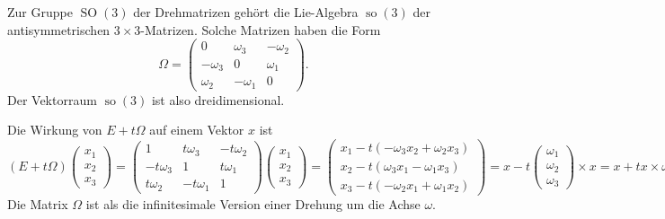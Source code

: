\begin{beispiel}
Zur Gruppe $\operatorname{SO}(3)$ der Drehmatrizen gehört die Lie-Algebra
$\operatorname{so}(3)$ der antisymmetrischen $3\times 3$-Matrizen.
%
Solche Matrizen haben die Form
\[
\Omega
=
\begin{pmatrix}
    0    & \omega_3&-\omega_2\\
-\omega_3&   0     & \omega_1\\
 \omega_2&-\omega_1&    0
\end{pmatrix}.
\]
Der Vektorraum $\operatorname{so}(3)$ ist also dreidimensional.

Die Wirkung von $E+t\Omega$ auf einem Vektor $x$ ist
\[
(E+t\Omega)
\begin{pmatrix}x_1\\x_2\\x_3\end{pmatrix}
=
\begin{pmatrix}
    1     & t\omega_3&-t\omega_2\\
-t\omega_3&   1      & t\omega_1\\
 t\omega_2&-t\omega_1&    1
\end{pmatrix}
\begin{pmatrix}x_1\\x_2\\x_3\end{pmatrix}
=
\begin{pmatrix}
x_1-t(-\omega_3x_2+\omega_2x_3)\\
x_2-t( \omega_3x_1-\omega_1x_3)\\
x_3-t(-\omega_2x_1+\omega_1x_2)
\end{pmatrix}
=
x- t\begin{pmatrix}\omega_1\\\omega_2\\\omega_3\end{pmatrix}\times x
=
x+ tx\times \omega.
\]
Die Matrix $\Omega$ ist als die infinitesimale Version einer Drehung
um die Achse $\omega$.


\end{beispiel}
